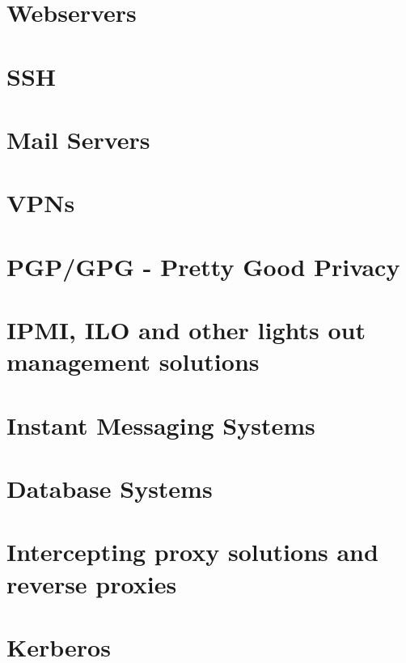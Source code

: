 \section{Webservers}
\label{sec:webservers}

\section{SSH}
\label{sec:ssh}

\section{Mail Servers}
\label{sec:mail-servers}

\section{VPNs}
\label{sec:vpns}

\section{PGP/GPG - Pretty Good Privacy}
\label{sec:pgpgpg-pretty-good}

%
\section{IPMI, ILO and other lights out management solutions}
\label{sec:ipmi-ilo-other}

\section{Instant Messaging Systems}
\label{sec:inst-mess-syst}

\section{Database Systems}
\label{sec:database-systems}

\section{Intercepting proxy solutions and reverse proxies}
\label{sec:interc-proxy-solut}

\section{Kerberos}
\label{sec:kerberos}


